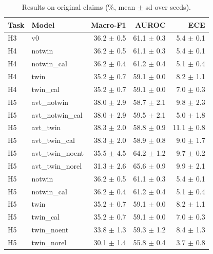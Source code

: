 \begin{table}[t]
\centering
\caption{Results on original claims (\%, mean $\pm$ sd over seeds).}
\label{tab:main}
\begin{tabular}{llrrr}
\toprule
Task & Model & Macro-F1 & AUROC & ECE \\
\midrule
H3 & v0 & 36.2 $\pm$ 0.5 & 61.1 $\pm$ 0.3 & 5.4 $\pm$ 0.1 \\
H4 & notwin & 36.2 $\pm$ 0.5 & 61.1 $\pm$ 0.3 & 5.4 $\pm$ 0.1 \\
H4 & notwin\_cal & 36.2 $\pm$ 0.4 & 61.2 $\pm$ 0.4 & 5.1 $\pm$ 0.4 \\
H4 & twin & 35.2 $\pm$ 0.7 & 59.1 $\pm$ 0.0 & 8.2 $\pm$ 1.1 \\
H4 & twin\_cal & 35.2 $\pm$ 0.7 & 59.1 $\pm$ 0.0 & 7.0 $\pm$ 0.3 \\
H5 & avt\_notwin & 38.0 $\pm$ 2.9 & 58.7 $\pm$ 2.1 & 9.8 $\pm$ 2.3 \\
H5 & avt\_notwin\_cal & 38.0 $\pm$ 2.9 & 59.5 $\pm$ 2.1 & 5.0 $\pm$ 1.8 \\
H5 & avt\_twin & 38.3 $\pm$ 2.0 & 58.8 $\pm$ 0.9 & 11.1 $\pm$ 0.8 \\
H5 & avt\_twin\_cal & 38.3 $\pm$ 2.0 & 58.9 $\pm$ 0.8 & 9.0 $\pm$ 1.7 \\
H5 & avt\_twin\_noent & 35.5 $\pm$ 4.5 & 64.2 $\pm$ 1.2 & 9.7 $\pm$ 0.2 \\
H5 & avt\_twin\_norel & 31.3 $\pm$ 2.6 & 65.6 $\pm$ 0.9 & 9.9 $\pm$ 2.1 \\
H5 & notwin & 36.2 $\pm$ 0.5 & 61.1 $\pm$ 0.3 & 5.4 $\pm$ 0.1 \\
H5 & notwin\_cal & 36.2 $\pm$ 0.4 & 61.2 $\pm$ 0.4 & 5.1 $\pm$ 0.4 \\
H5 & twin & 35.2 $\pm$ 0.7 & 59.1 $\pm$ 0.0 & 8.2 $\pm$ 1.1 \\
H5 & twin\_cal & 35.2 $\pm$ 0.7 & 59.1 $\pm$ 0.0 & 7.0 $\pm$ 0.3 \\
H5 & twin\_noent & 33.8 $\pm$ 1.3 & 59.3 $\pm$ 1.2 & 8.4 $\pm$ 1.3 \\
H5 & twin\_norel & 30.1 $\pm$ 1.4 & 55.8 $\pm$ 0.4 & 3.7 $\pm$ 0.8 \\
\bottomrule
\end{tabular}
\end{table}
